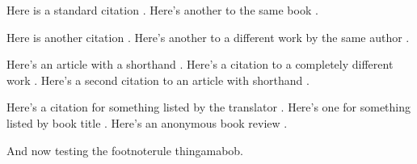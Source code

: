 \documentclass[12pt]{article}
\begin{document}
	Here is a standard citation \autocite[32]{haggis99aa}.  Here's another to the same book \autocite[33--40]{haggis99aa}.
	
	Here is another citation \autocite[12]{askme06aa}.  Here's another to a different work by the same author \autocite[30]{askme92aa}.
	
	Here's an article with a shorthand \autocite[12]{taskme06aa}.  Here's a citation to a completely different work \autocite[32]{haggis99aa}. Here's a second citation to an article with shorthand \autocite[17]{taskme06aa}.
	
	Here's a citation for something listed by the translator \autocite[22]{coulson64aa}.  Here's one for something listed by book title \autocite[978]{octovian86aa}.  Here's an anonymous book review \autocite{danish1972aa}.

And now testing the footnoterule thingamabob.%
\end{document}
